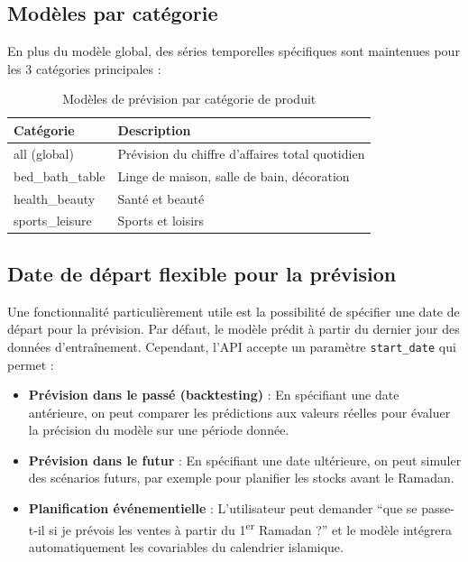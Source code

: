 \documentclass[12pt,a4paper]{report}
\begin{document}
\subsection{Mod\`{e}les par cat\'{e}gorie}

En plus du mod\`{e}le global, des s\'{e}ries temporelles sp\'{e}cifiques sont maintenues pour les 3 cat\'{e}gories principales :

\begin{table}[H]
\centering
\caption{Mod\`{e}les de pr\'{e}vision par cat\'{e}gorie de produit}
\label{tab:forecast_cats}
\begin{tabularx}{\textwidth}{l X}
\toprule
\textbf{Cat\'{e}gorie} & \textbf{Description} \\
\midrule
all (global) & Pr\'{e}vision du chiffre d'affaires total quotidien \\
bed\_bath\_table & Linge de maison, salle de bain, d\'{e}coration \\
health\_beauty & Sant\'{e} et beaut\'{e} \\
sports\_leisure & Sports et loisirs \\
\bottomrule
\end{tabularx}
\end{table}

\subsection{Date de d\'{e}part flexible pour la pr\'{e}vision}

Une fonctionnalit\'{e} particuli\`{e}rement utile est la possibilit\'{e} de sp\'{e}cifier une date de d\'{e}part pour la pr\'{e}vision. Par d\'{e}faut, le mod\`{e}le pr\'{e}dit \`{a} partir du dernier jour des donn\'{e}es d'entra\^{i}nement. Cependant, l'API accepte un param\`{e}tre \texttt{start\_date} qui permet :

\begin{itemize}
  \item \textbf{Pr\'{e}vision dans le pass\'{e} (backtesting)} : En sp\'{e}cifiant une date ant\'{e}rieure, on peut comparer les pr\'{e}dictions aux valeurs r\'{e}elles pour \'{e}valuer la pr\'{e}cision du mod\`{e}le sur une p\'{e}riode donn\'{e}e.
  
  \item \textbf{Pr\'{e}vision dans le futur} : En sp\'{e}cifiant une date ult\'{e}rieure, on peut simuler des sc\'{e}narios futurs, par exemple pour planifier les stocks avant le Ramadan.
  
  \item \textbf{Planification \'{e}v\'{e}nementielle} : L'utilisateur peut demander ``que se passe-t-il si je pr\'{e}vois les ventes \`{a} partir du 1\textsuperscript{er} Ramadan ?'' et le mod\`{e}le int\'{e}grera automatiquement les covariables du calendrier islamique.
\end{itemize}
\end{document}
